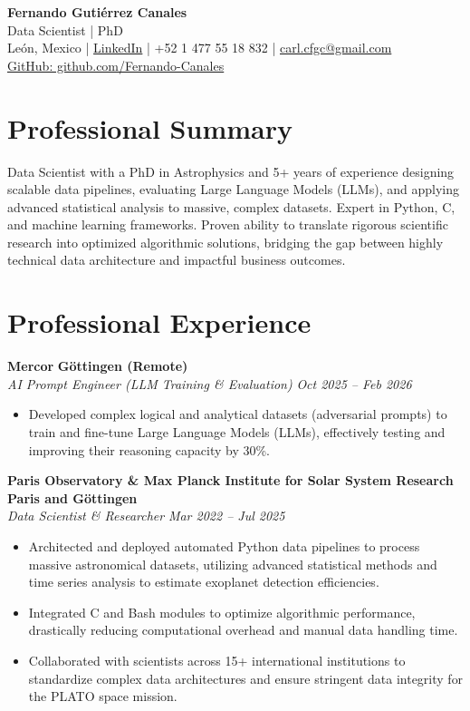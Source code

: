 \documentclass[10pt,a4paper]{article}
\begin{document}
\begin{center}
    {\Huge \textbf{Fernando Gutiérrez Canales}}\\
    {\Large Data Scientist | PhD}\\    
    León, Mexico \quad | \quad \href{https://www.linkedin.com/in/fernando-guti%C3%A9rrez-canales-804876343/}{LinkedIn} \quad | \quad +52 1 477 55 18 832 \quad | \quad \href{mailto:carl.cfgc@gmail.com}{carl.cfgc@gmail.com} \\
     \href{https://github.com/Fernando-Canales}{GitHub: github.com/Fernando-Canales}
\end{center}

\vspace{1em}

\section*{Professional Summary}
Data Scientist with a PhD in Astrophysics and 5+ years of experience designing scalable data pipelines, evaluating Large Language Models (LLMs), and applying advanced statistical analysis to massive, complex datasets. Expert in Python, C, and machine learning frameworks. Proven ability to translate rigorous scientific research into optimized algorithmic solutions, bridging the gap between highly technical data architecture and impactful business outcomes.

\section*{Professional Experience}
\textbf{Mercor} \hfill \textbf{Göttingen (Remote)} \\
\textit{AI Prompt Engineer (LLM Training \& Evaluation)} \hfill \textit{Oct 2025 -- Feb 2026}
\begin{itemize}[leftmargin=1.5em]
	\item Developed complex logical and analytical datasets (adversarial prompts) to train and fine-tune Large Language Models (LLMs), effectively testing and improving their reasoning capacity by 30\%.
\end{itemize}

\textbf{Paris Observatory \& Max Planck Institute for Solar System Research} \hfill \textbf{Paris and Göttingen} \\
\textit{Data Scientist \& Researcher} \hfill \textit{Mar 2022 -- Jul 2025}
\begin{itemize}[leftmargin=1.5em]
    \item Architected and deployed automated Python data pipelines to process massive astronomical datasets, utilizing advanced statistical methods and time series analysis to estimate exoplanet detection efficiencies.
    \item Integrated C and Bash modules to optimize algorithmic performance, drastically reducing computational overhead and manual data handling time.
    \item Collaborated with scientists across 15+ international institutions to standardize complex data architectures and ensure stringent data integrity for the PLATO space mission.
\end{itemize}
\end{document}

